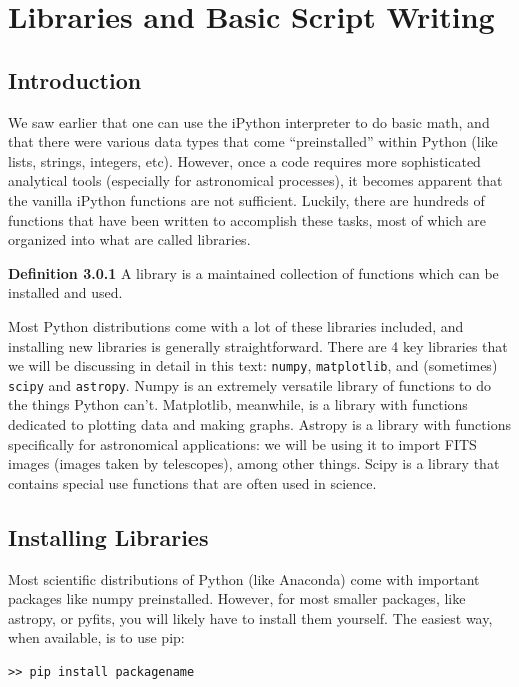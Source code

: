 \chapter{Libraries and Basic Script Writing}

\section{Introduction}
We saw earlier that one can use the iPython interpreter to do basic math, and that there were various data types that come ``preinstalled'' within Python (like lists, strings, integers, etc). However, once a code requires more sophisticated analytical tools (especially for astronomical processes), it becomes apparent that the vanilla iPython functions are not sufficient. Luckily, there are hundreds of functions that have been written to accomplish these tasks, most of which are organized into what are called libraries.

\textbf{Definition 3.0.1} A library is a maintained collection of functions which can be installed and used.

Most Python distributions come with a lot of these libraries included, and installing new libraries is generally straightforward. There are 4 key libraries that we will be discussing in detail in this text: \texttt{numpy}, \texttt{matplotlib}, and (sometimes) \texttt{scipy} and \texttt{astropy}. Numpy is an extremely versatile library of functions to do the things Python can't. Matplotlib, meanwhile, is a library with functions dedicated to plotting data and making graphs. Astropy is a library with functions specifically for astronomical applications: we will be using it to import FITS images (images taken by telescopes), among other things. Scipy is a library that contains special use functions that are often used in science.

\section{Installing Libraries}
Most scientific distributions of Python (like Anaconda) come with important packages like numpy preinstalled. However, for most smaller packages, like astropy, or pyfits, you will likely have to install them yourself. The easiest way, when available, is to use pip:

\begin{lstlisting}
>> pip install packagename
\end{lstlisting}


